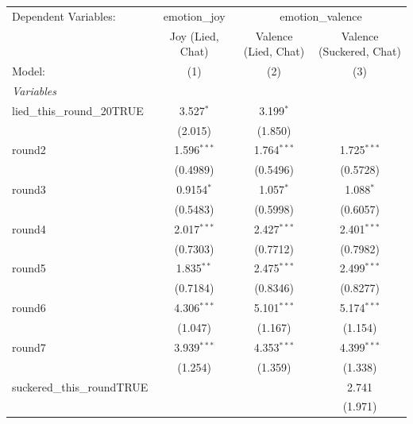 
\begingroup
\centering
\begin{tabular}{lccc}
   \tabularnewline \midrule \midrule
   Dependent Variables: & emotion\_joy & \multicolumn{2}{c}{emotion\_valence}\\
                                & Joy (Lied, Chat) & Valence (Lied, Chat) & Valence (Suckered, Chat) \\   
   Model:                       & (1)              & (2)                  & (3)\\  
   \midrule
   \emph{Variables}\\
   lied\_this\_round\_20TRUE    & 3.527$^{*}$      & 3.199$^{*}$          &   \\   
                                & (2.015)          & (1.850)              &   \\   
   round2                       & 1.596$^{***}$    & 1.764$^{***}$        & 1.725$^{***}$\\   
                                & (0.4989)         & (0.5496)             & (0.5728)\\   
   round3                       & 0.9154$^{*}$     & 1.057$^{*}$          & 1.088$^{*}$\\   
                                & (0.5483)         & (0.5998)             & (0.6057)\\   
   round4                       & 2.017$^{***}$    & 2.427$^{***}$        & 2.401$^{***}$\\   
                                & (0.7303)         & (0.7712)             & (0.7982)\\   
   round5                       & 1.835$^{**}$     & 2.475$^{***}$        & 2.499$^{***}$\\   
                                & (0.7184)         & (0.8346)             & (0.8277)\\   
   round6                       & 4.306$^{***}$    & 5.101$^{***}$        & 5.174$^{***}$\\   
                                & (1.047)          & (1.167)              & (1.154)\\   
   round7                       & 3.939$^{***}$    & 4.353$^{***}$        & 4.399$^{***}$\\   
                                & (1.254)          & (1.359)              & (1.338)\\   
   suckered\_this\_roundTRUE    &                  &                      & 2.741\\   
                                &                  &                      & (1.971)\\   

\end{tabular}
